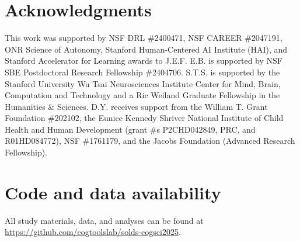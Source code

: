 \documentclass[10pt,letterpaper]{article}
\begin{document}
\section{Acknowledgments}
This work was supported by NSF DRL \#2400471, NSF CAREER \#2047191, ONR Science of Autonomy, Stanford Human-Centered AI Institute (HAI), and Stanford Accelerator for Learning awards to J.E.F.
E.B. is supported by NSF SBE Postdoctoral Research Fellowship \#2404706. 
S.T.S. is supported by the Stanford University Wu Tsai Neurosciences Institute Center for Mind, Brain, Computation and Technology and a Ric Weiland Graduate Fellowship in the Humanities \& Sciences. 
D.Y. receives support from the William T. Grant Foundation \#202102, the Eunice Kennedy Shriver National Institute of Child Health and Human Development (grant \#s P2CHD042849, PRC, and R01HD084772), NSF \#1761179, and the Jacobs Foundation (Advanced Research Fellowship).

\section{Code and data availability}
All study materials, data, and analyses can be found at \url{https://github.com/cogtoolslab/solds-cogsci2025}.



\setlength{\bibleftmargin}{.125in}
\setlength{\bibindent}{-\bibleftmargin}


\end{document}

